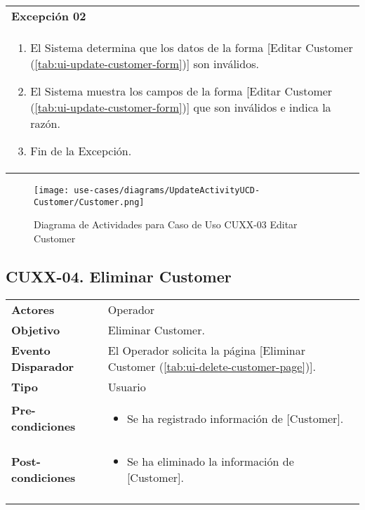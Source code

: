 	\begin{tabular}{ p{15.5cm} }
		\textbf{Excepci\'on 02} \\
		\begin{enumerate}
			\item El Sistema determina que los datos de la forma [Editar Customer (\ref{tab:ui-update-customer-form})] son inv\'alidos.
			\item El Sistema muestra los campos de la forma [Editar Customer (\ref{tab:ui-update-customer-form})] que son inv\'alidos e indica la raz\'on.
			\item Fin de la Excepci\'on.
		\end{enumerate}
	\end{tabular}
	
	\begin{figure}[H]
		\begin{center}
		 \label{tab:activity-update-ucd-entity-customer}
		 \texttt{[image: use-cases/diagrams/UpdateActivityUCD-Customer/Customer.png]}
		 \caption{Diagrama de Actividades para Caso de Uso CUXX-03 Editar Customer}
		\end{center}
	\end{figure}
	
	\clearpage
	\subsection{CUXX-04. Eliminar Customer} \label{sec:cu-delete-Customer}
	
	\begin{tabular}{ p{3.5cm} p{11.5cm} }
		\textbf{Actores} & Operador\\
		\textbf{Objetivo} & Eliminar Customer.\\
		\textbf{Evento Disparador} & El Operador solicita la p\'agina [Eliminar Customer (\ref{tab:ui-delete-customer-page})].\\
		\textbf{Tipo} & Usuario\\
		\textbf{Pre-condiciones} &
			\begin{minipage}[t]{0.6\textwidth}
			\begin{itemize}[noitemsep,nolistsep]
			\setlength{\itemindent}{-.5cm}
				\item Se ha registrado informaci\'on de [Customer].
			\end{itemize}
			\end{minipage} \\
		\textbf{Post-condiciones} &
			\begin{minipage}[t]{0.6\textwidth}
			\begin{itemize}[noitemsep,nolistsep]
			\setlength{\itemindent}{-.5cm}
				\item Se ha eliminado la informaci\'on de [Customer].
			\end{itemize}
			\end{minipage} \\
		\\
	\end{tabular}
	

